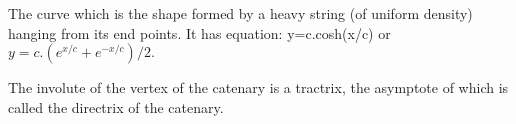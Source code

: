 The curve which is the shape formed by a heavy string (of uniform density)
hanging from its end points. It has equation: 
y=c.cosh(x/c) or $y=c.(e^{x/c}+e^{-x/c})/2.$ 
\par
The involute of the vertex of the catenary is a tractrix, the asymptote of
which is called the directrix of the catenary.
